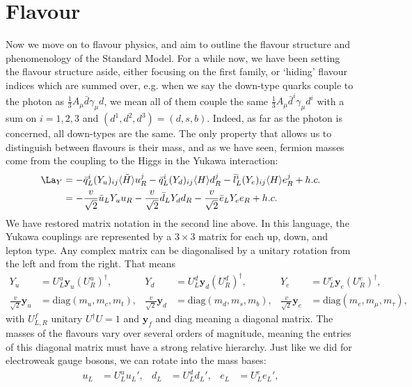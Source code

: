 \documentclass[a4paper, 11pt, normalem]{report}
\begin{document}
\section{Flavour}
Now we move on to flavour physics, and aim to outline the flavour structure and phenomenology of the Standard Model.
For a while now, we have been setting the flavour structure aside, either focusing on the first family, or `hiding' flavour indices which are summed over, e.g. when we say the down-type quarks couple to the photon as $\frac{1}{3}A_\mu\bar{d}\gamma_\mu d$, we mean all of them couple the same $\frac{1}{3}A_\mu\bar{d}^i\gamma_\mu d^i$ with a sum on $i=1,2,3$ and $(d^1,d^2,d^3)=(d,s,b)$.
Indeed, as far as the photon is concerned, all down-types are the same.
The only property that allows us to distinguish between flavours is their mass, and as we have seen, fermion masses come from the coupling to the Higgs in the Yukawa interaction:
\begin{align}
    \begin{split}
        \La_Y &= -\bar{q}_L^i(Y_u)_{ij}\langle\tilde{H}\rangle u_R^j - \bar{q}_L^i(Y_d)_{ij}\langle H\rangle d_R^j - \bar{l}_L^i(Y_e)_{ij}\langle H\rangle e_R^j + h.c. \\
              &= -\frac{v}{\sqrt{2}}\bar{u}_L Y_u u_R - \frac{v}{\sqrt{2}}\bar{d}_L Y_d d_R - \frac{v}{\sqrt{2}}\bar{e}_L Y_e e_R + h.c.
    \end{split}
\end{align}
We have restored matrix notation in the second line above.
In this language, the Yukawa couplings are represented by a $3\times3$ matrix for each up, down, and lepton type.
Any complex matrix can be diagonalised by a unitary rotation from the left and from the right. That means
\begin{align}
    Y_u &= U_L^u\mathbf{y}_u(U_R^u)^\dagger, & Y_d &= U_L^d\mathbf{y}_d(U_R^d)^\dagger, & Y_e &= U_L^e\mathbf{y}_e(U_R^e)^\dagger, \\
    \frac{v}{\sqrt{2}}\mathbf{y}_u &= \text{diag}(m_u,m_c,m_t), & \frac{v}{\sqrt{2}}\mathbf{y}_d &= \text{diag}(m_d,m_s,m_b), & \frac{v}{\sqrt{2}}\mathbf{y}_e &= \text{diag}(m_e,m_\mu,m_\tau),
\end{align}
with $U_{L,R}^f$ unitary $U^\dagger U=1$ and $\mathbf{y}_f$ and diag meaning a diagonal matrix.
The masses of the flavours vary over several orders of magnitude, meaning the entries of this diagonal matrix must have a strong relative hierarchy.
Just like we did for electroweak gauge bosons, we can rotate into the mass bases:
\begin{align}
    u_L &= U_L^uu_L', & d_L &= U_L^dd_L', & e_L &= U_L^ee_L',
\end{align}
\end{document}
